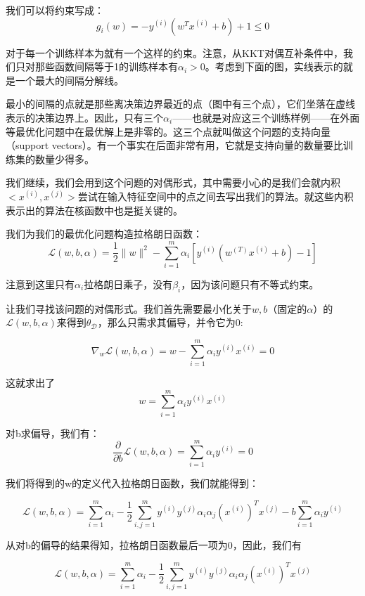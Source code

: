 \documentclass[UTF8]{ctexart}
\begin{document}
我们可以将约束写成：
\[ g_{i}(w) =  -y^{(i)}(w^{T}x^{(i)}+b)+1 \leq 0 \]

对于每一个训练样本为就有一个这样的约束。注意，从KKT对偶互补条件中，我们只对那些函数间隔等于1的训练样本有$\alpha_{i} > 0$。考虑到下面的图，实线表示的就是一个最大的间隔分解线。

\begin{figure}[htb]        
\end{figure}


最小的间隔的点就是那些离决策边界最近的点（图中有三个点），它们坐落在虚线表示的决策边界上。因此，只有三个$\alpha_{i}$——也就是对应这三个训练样例——在外面等最优化问题中在最优解上是非零的。这三个点就叫做这个问题的支持向量（support vectors）。有一个事实在后面非常有用，它就是支持向量的数量要比训练集的数量少得多。

我们继续，我们会用到这个问题的对偶形式，其中需要小心的是我们会就内积$<x^{(i)},x^{(j)}>$尝试在输入特征空间中的点之间去写出我们的算法。就这些内积表示出的算法在核函数中也是挺关键的。

我们为我们的最优化问题构造拉格朗日函数：
\[\mathcal{L}(w,b,\alpha) = \frac{1}{2} \|w\|^{2} - \sum_{i=1}^{m}\alpha_{i} [ y^{(i)}(w^{(T)}x^{(i)}+b)-1 ] \]

注意到这里只有$\alpha_{i}$拉格朗日乘子，没有$\beta_{i}$，因为该问题只有不等式约束。

让我们寻找该问题的对偶形式。我们首先需要最小化关于$w,b$（固定的$\alpha$）的$\mathcal{L}(w,b,\alpha)$来得到$\theta_{\mathcal{D}}$，那么只需求其偏导，并令它为0:


\[ \nabla_{w} \mathcal{L}(w,b,\alpha) = w - \sum_{i=1}^{m} \alpha_{i}y^{(i)}x^{(i)} = 0  \]

这就求出了\[ w = \sum_{i=1}^{m} \alpha_{i}y^{(i)}x^{(i)} \]

对b求偏导，我们有：\[\frac{\partial}{\partial{b}} \mathcal{L}(w,b,\alpha)  = \sum_{i=1}^{m} \alpha_{i}y^{(i)} = 0 \]

我们将得到的w的定义代入拉格朗日函数，我们就能得到：

\[ \mathcal{L}(w,b,\alpha) =  \sum_{i=1}^{m} \alpha_{i} - \frac{1}{2} \sum_{i,j=1}^{m}y^{(i)}y^{(j)}\alpha_{i}\alpha_{j}(x^{(i)})^{T}x^{(j)} - b \sum_{i=1}^{m}\alpha_{i}y^{(i)}  \]

从对b的偏导的结果得知，拉格朗日函数最后一项为0，因此，我们有

\[ \mathcal{L}(w,b,\alpha) =  \sum_{i=1}^{m} \alpha_{i} - \frac{1}{2} \sum_{i,j=1}^{m}y^{(i)}y^{(j)}\alpha_{i}\alpha_{j}(x^{(i)})^{T}x^{(j)} \]
\end{document}
